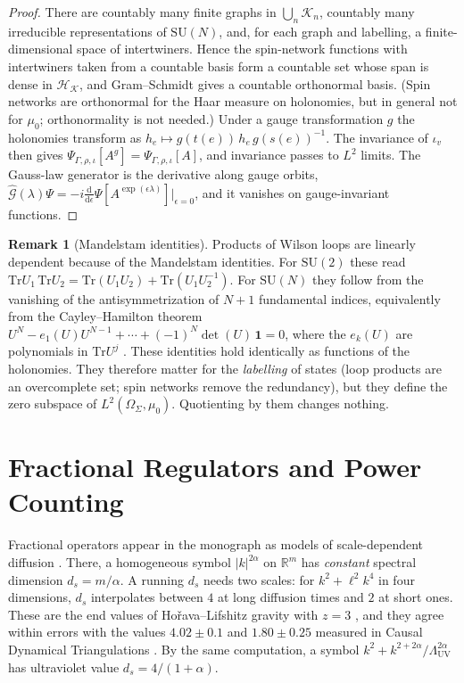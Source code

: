 \documentclass[11pt,a4paper]{amsart}
\theoremstyle{definition}
\newtheorem{remark}[theorem]{Remark}
\newcommand{\R}{\mathbb{R}}
\newcommand{\cH}{\mathcal{H}}
\newcommand{\Tr}{\mathrm{Tr}}
\newcommand{\diff}{\mathrm{d}}
\begin{document}
\begin{proof}
There are countably many finite graphs in $\bigcup_n \mathcal{K}_n$, countably many irreducible representations of $\mathrm{SU}(N)$, and, for each graph and labelling, a finite-dimensional space of intertwiners. Hence the spin-network functions with intertwiners taken from a countable basis form a countable set whose span is dense in $\cH_{\mathcal{K}}$, and Gram--Schmidt gives a countable orthonormal basis. (Spin networks are orthonormal for the Haar measure on holonomies, but in general not for $\mu_0$; orthonormality is not needed.) Under a gauge transformation $g$ the holonomies transform as $h_e \mapsto g(t(e))\, h_e\, g(s(e))^{-1}$. The invariance of $\iota_v$ then gives $\Psi_{\Gamma,\rho,\iota}[A^g] = \Psi_{\Gamma,\rho,\iota}[A]$, and invariance passes to $L^2$ limits. The Gauss-law generator is the derivative along gauge orbits, $\hat{\mathcal{G}}(\lambda)\Psi = -i \frac{\diff}{\diff \epsilon} \Psi[A^{\exp(\epsilon\lambda)}]|_{\epsilon=0}$, and it vanishes on gauge-invariant functions.
\end{proof}

\begin{remark}[Mandelstam identities]
\label{rem:mandelstam}
Products of Wilson loops are linearly dependent because of the Mandelstam identities. For $\mathrm{SU}(2)$ these read $\Tr U_1 \,\Tr U_2 = \Tr(U_1U_2) + \Tr(U_1U_2^{-1})$. For $\mathrm{SU}(N)$ they follow from the vanishing of the antisymmetrization of $N+1$ fundamental indices, equivalently from the Cayley--Hamilton theorem $U^N - e_1(U)U^{N-1} + \cdots + (-1)^N \det(U)\,\mathbf{1} = 0$, where the $e_k(U)$ are polynomials in $\Tr U^j$ \cite{giles1981reconstruction}. These identities hold identically as functions of the holonomies. They therefore matter for the \emph{labelling} of states (loop products are an overcomplete set; spin networks remove the redundancy), but they define the zero subspace of $L^2(\Omega_\Sigma,\mu_0)$. Quotienting by them changes nothing.
\end{remark}

\section{Fractional Regulators and Power Counting}

Fractional operators appear in the monograph as models of scale-dependent diffusion \cite[Ch.~12]{silvafilho2026book}. There, a homogeneous symbol $|k|^{2\alpha}$ on $\R^m$ has \emph{constant} spectral dimension $d_s = m/\alpha$. A running $d_s$ needs two scales: for $k^2 + \ell^2 k^4$ in four dimensions, $d_s$ interpolates between $4$ at long diffusion times and $2$ at short ones. These are the end values of Ho\v{r}ava--Lifshitz gravity with $z = 3$ \cite{horava2009spectral}, and they agree within errors with the values $4.02\pm0.1$ and $1.80\pm0.25$ measured in Causal Dynamical Triangulations \cite{ambjorn2005spectral}. By the same computation, a symbol $k^2 + k^{2+2\alpha}/\Lambda_{\mathrm{UV}}^{2\alpha}$ has ultraviolet value $d_s = 4/(1+\alpha)$.
\end{document}

